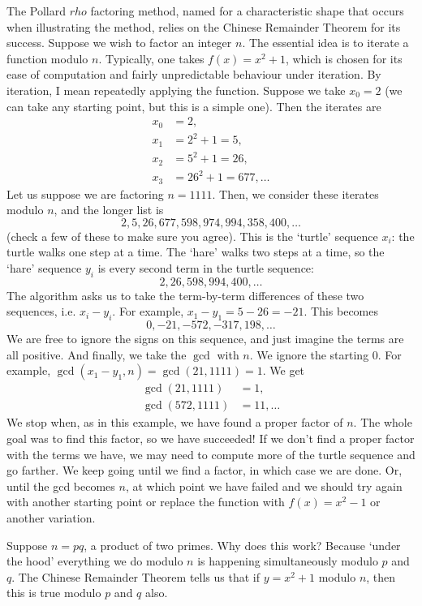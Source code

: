 \documentclass{article}
\theoremstyle{plain}
\theoremstyle{definition}
\theoremstyle{remark}
\numberwithin{theorem}{section}
\begin{document}
The Pollard $rho$ factoring method, named for a characteristic shape that occurs when illustrating the method, relies on the Chinese Remainder Theorem for its success.  Suppose we wish to factor an integer $n$.
The essential idea is to iterate a function modulo $n$.  Typically, one takes $f(x) = x^2 + 1$, which is chosen for its ease of computation and fairly unpredictable behaviour under iteration.  By iteration, I mean repeatedly applying the function.  Suppose we take $x_0 = 2$ (we can take any starting point, but this is a simple one).  Then the iterates are
\begin{align*}
x_0 &= 2, \\
x_1 &= 2^2 + 1 = 5, \\
x_2 &= 5^2 + 1 = 26, \\
x_3 &= 26^2 + 1 = 677, \ldots
\end{align*}
Let us suppose we are factoring $n=1111$.  Then, we consider these iterates modulo $n$, and the longer list is
\[
2, 5, 26, 677, 598, 974, 994, 358, 400, \ldots
\]
(check a few of these to make sure you agree).  This is the `turtle' sequence $x_i$:  the turtle walks one step at a time.  The `hare' walks two steps at a time, so the `hare' sequence $y_i$ is every second term in the turtle sequence:
\[
2, 26, 598, 994, 400, \ldots
\]
The algorithm asks us to take the term-by-term differences of these two sequences, i.e. $x_i - y_i$.  For example, $x_1 - y_1 = 5 - 26 = -21$.  This becomes
\[
0, -21, -572, -317, 198, \ldots
\]
We are free to ignore the signs on this sequence, and just imagine the terms are all positive.
And finally, we take the $\gcd$ with $n$.  We ignore the starting $0$.  For example, $\gcd(x_1 - y_1, n) = \gcd(21, 1111) = 1$.  We get
\begin{align*}
    \gcd(21, 1111) &= 1, \\
    \gcd(572,1111) &= 11, \ldots
\end{align*}
We stop when, as in this example, we have found a proper factor of $n$.  The whole goal was to find this factor, so we have succeeded!  If we don't find a proper factor with the terms we have, we may need to compute more of the turtle sequence and go farther.  We keep going until we find a factor, in which case we are done.  Or, until the gcd becomes $n$, at which point we have failed and we should try again with another starting point or replace the function with $f(x)=x^2-1$ or another variation.

Suppose $n = pq$, a product of two primes.  Why does this work?  Because `under the hood' everything we do modulo $n$ is happening simultaneously modulo $p$ and $q$.  The Chinese Remainder Theorem tells us that if $y = x^2 + 1$ modulo $n$, then this is true modulo $p$ and $q$ also.
\end{document}
